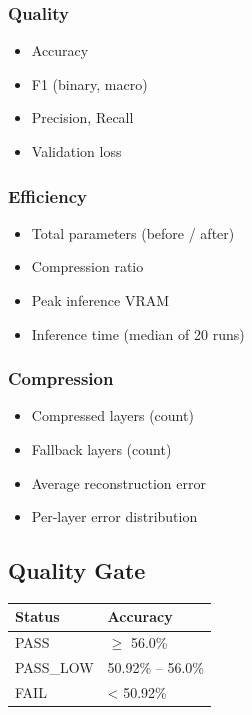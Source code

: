 \subsubsection{Quality}

\begin{itemize}
\item Accuracy
\item F1 (binary, macro)
\item Precision, Recall
\item Validation loss

\end{itemize}
\subsubsection{Efficiency}

\begin{itemize}
\item Total parameters (before / after)
\item Compression ratio
\item Peak inference VRAM
\item Inference time (median of 20 runs)

\end{itemize}
\subsubsection{Compression}

\begin{itemize}
\item Compressed layers (count)
\item Fallback layers (count)
\item Average reconstruction error
\item Per-layer error distribution

\end{itemize}
\subsection{Quality Gate}

\begin{table}[H]
\centering
\small
\begin{tabular}{ll}
\toprule
\textbf{Status} & \textbf{Accuracy} \\
\midrule
PASS & $\ge$ 56.0\% \\
PASS\_LOW & 50.92\% -- 56.0\% \\
FAIL & \textless{} 50.92\% \\
\bottomrule
\end{tabular}
\end{table}

